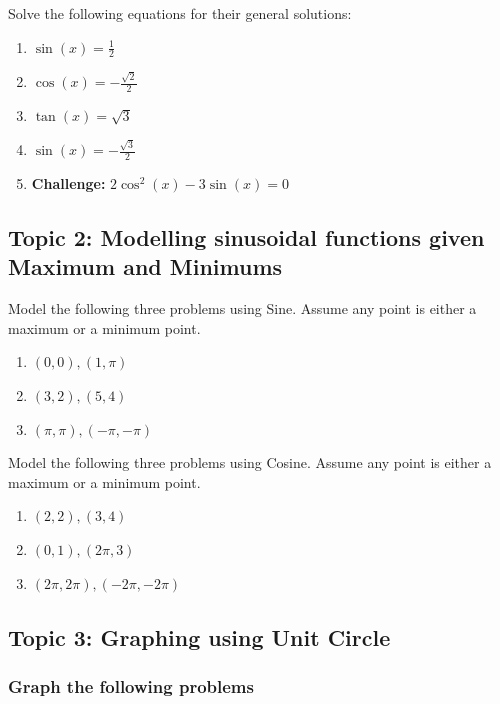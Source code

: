 \documentclass[letterpaper]{article}
\def\tightlist{}
\begin{document}
Solve the following equations for their general solutions:

\begin{enumerate}
\def\labelenumi{\arabic{enumi}.}
\tightlist
\item
  \(\sin(x) = \frac{1}{2}\)
\item
  \(\cos(x) = -\frac{\sqrt{2}}{2}\)
\item
  \(\tan(x) = \sqrt{3}\)
\item
  \(\sin(x) = -\frac{\sqrt{3}}{2}\)
\item
  \textbf{Challenge:} \(2\cos^2(x) - 3\sin(x) = 0\)
\end{enumerate}

\subsection{Topic 2: Modelling sinusoidal functions given Maximum and Minimums}\label{topic-2-modelling-sinusoidal-functions-given-maximum-and-minimums}

Model the following three problems using Sine. Assume any point is either a maximum or a minimum point.

\begin{enumerate}
\def\labelenumi{\arabic{enumi}.}
\tightlist
\item
  \((0,0),(1,\pi)\)
\item
  \((3,2),(5,4)\)
\item
  \((\pi,\pi),(-\pi,-\pi)\)
\end{enumerate}

Model the following three problems using Cosine. Assume any point is either a maximum or a minimum point.

\begin{enumerate}
\def\labelenumi{\arabic{enumi}.}
\tightlist
\item
  \((2,2),(3,4)\)
\item
  \((0,1),(2\pi,3)\)
\item
  \((2\pi,2\pi),(-2\pi,-2\pi)\)
\end{enumerate}

\subsection{Topic 3: Graphing using Unit Circle}\label{topic-3-graphing-using-unit-circle}

\subsubsection{Graph the following problems}\label{graph-the-following-problems}
\end{document}
